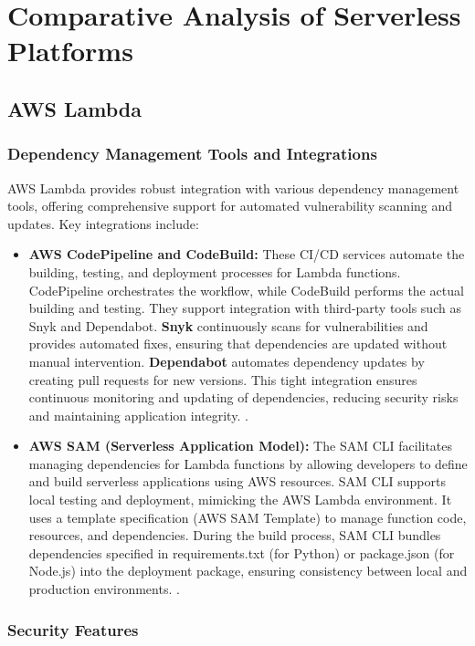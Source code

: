 \documentclass[sigconf]{acmart}
\begin{document}
\section{Comparative Analysis of Serverless Platforms}

\subsection{AWS Lambda}

\subsubsection{Dependency Management Tools and Integrations}

AWS Lambda provides robust integration with various dependency management tools, offering comprehensive support for automated vulnerability scanning and updates. Key integrations include:

\begin{itemize}
    \item \textbf{AWS CodePipeline and CodeBuild:} These CI/CD services automate the building, testing, and deployment processes for Lambda functions. CodePipeline orchestrates the workflow, while CodeBuild performs the actual building and testing. They support integration with third-party tools such as Snyk and Dependabot. \textbf{Snyk} continuously scans for vulnerabilities and provides automated fixes, ensuring that dependencies are updated without manual intervention. \textbf{Dependabot} automates dependency updates by creating pull requests for new versions. This tight integration ensures continuous monitoring and updating of dependencies, reducing security risks and maintaining application integrity. \cite{awsCI2023}.
    \item \textbf{AWS SAM (Serverless Application Model):} The SAM CLI facilitates managing dependencies for Lambda functions by allowing developers to define and build serverless applications using AWS resources. SAM CLI supports local testing and deployment, mimicking the AWS Lambda environment. It uses a template specification (AWS SAM Template) to manage function code, resources, and dependencies. During the build process, SAM CLI bundles dependencies specified in requirements.txt (for Python) or package.json (for Node.js) into the deployment package, ensuring consistency between local and production environments. \cite{awssam2023}.
\end{itemize}

\subsubsection{Security Features}
\end{document}
